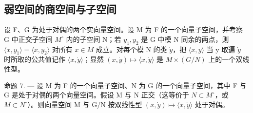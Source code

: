 \subsection{弱空间的商空间与子空间}

设 F、G 为处于对偶的两个实向量空间。设 M 为 F 的一个向量子空间，并考察 G 中正交子空间 \(M^{\circ}\) 内的子空间 N；若 \(y_{1}, y_{2}\) 是 G 中模 N 同余的两点，则 \(\langle x, y_{1} \rangle = \langle x, y_{2} \rangle\) 对所有 \(x \in M\) 成立。对每个模 N 的类 \(\dot{y}\)，把 \(\langle x, y \rangle\) 当 y 取遍 \(\dot{y}\) 时所取的公共值记作 \(\langle x, \dot{y} \rangle\)；显然 \((x, \dot{y}) \mapsto \langle x, \dot{y} \rangle\) 是 \(M \times (G/N)\) 上的一个双线性型。

命题 7. --- 设 M 为 F 的一个向量子空间、N 为 G 的一个向量子空间，其中 F 与 G 是处于对偶的两个向量空间。假设 M 与 N 正交（这等价于 \(N \subset M^{\circ}\)，或 \(M \subset N^{\circ}\)）。则向量空间 M 与 G/N 按双线性型 \((x, \dot{y}) \mapsto \langle x, \dot{y} \rangle\) 处于对偶。

